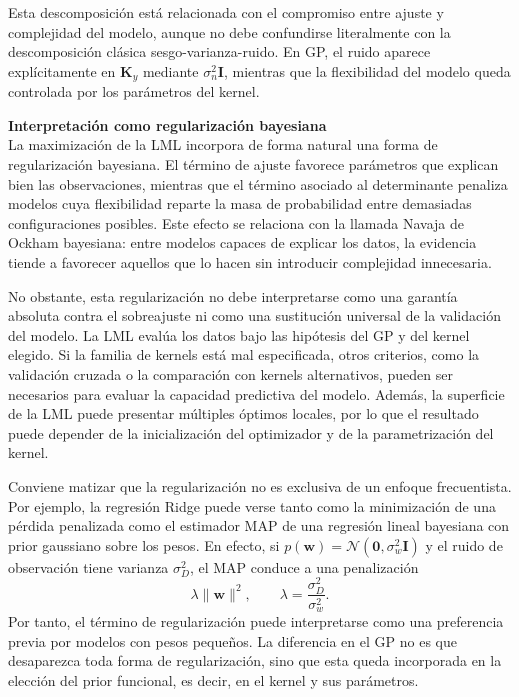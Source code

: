 Esta descomposición está relacionada con el compromiso entre ajuste y complejidad del
modelo, aunque no debe confundirse literalmente con la descomposición clásica
sesgo-varianza-ruido. En GP, el ruido aparece explícitamente en \(\bm{K}_y\) mediante
\(\sigma_n^2\bm{I}\), mientras que la flexibilidad del modelo queda controlada por los
parámetros del kernel.


\vspace{0.3cm}
\noindent\textbf{Interpretación como regularización bayesiana} \\

La maximización de la LML incorpora de forma natural una forma de
regularización bayesiana. El término de ajuste favorece parámetros que explican bien
las observaciones, mientras que el término asociado al determinante penaliza modelos cuya
flexibilidad reparte la masa de probabilidad entre demasiadas configuraciones posibles. Este
efecto se relaciona con la llamada Navaja de Ockham bayesiana: entre modelos capaces de
explicar los datos, la evidencia tiende a favorecer aquellos que lo hacen sin introducir
complejidad innecesaria.

No obstante, esta regularización no debe interpretarse como una garantía absoluta contra el
sobreajuste ni como una sustitución universal de la validación del modelo. La LML evalúa
los datos bajo las hipótesis del GP y del kernel elegido. Si la familia de kernels está mal
especificada, otros criterios, como la validación cruzada o la comparación con kernels
alternativos, pueden ser necesarios para evaluar la capacidad predictiva del modelo. Además,
la superficie de la LML puede presentar múltiples óptimos locales, por lo que el resultado
puede depender de la inicialización del optimizador y de la parametrización del kernel.

Conviene matizar que la regularización no es exclusiva de un enfoque
frecuentista. Por ejemplo, la regresión Ridge puede verse tanto como la minimización de una pérdida penalizada como el estimador MAP de una regresión lineal bayesiana con prior gaussiano sobre los pesos. En efecto, si
\(
p(\bm{w})=\mathcal{N}(\bm{0},\sigma_w^2\bm{I})
\)
y el ruido de observación tiene varianza \(\sigma_D^2\), el MAP conduce a una penalización
\[
\lambda\|\bm{w}\|^2,
\qquad
\lambda=\frac{\sigma_D^2}{\sigma_w^2}.
\]
Por tanto, el término de regularización puede interpretarse como una preferencia previa por modelos con pesos pequeños. La diferencia en el GP no es que desaparezca toda forma de regularización, sino que esta queda incorporada en la elección del prior funcional, es decir, en el kernel y sus parámetros.

